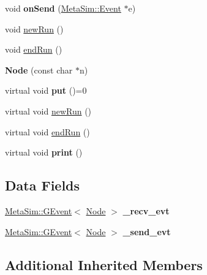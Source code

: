 \begin{DoxyCompactItemize}
\item 
void {\bfseries on\+Send} (\hyperlink{classMetaSim_1_1Event}{Meta\+Sim\+::\+Event} $\ast$e)\hypertarget{classNode_a5d78ceb9ef8fe8a3f0a89a7dd3409ce0}{}\label{classNode_a5d78ceb9ef8fe8a3f0a89a7dd3409ce0}

\item 
void \hyperlink{classNode_a7154231b573b4f86f200b890b580cc14}{new\+Run} ()
\item 
void \hyperlink{classNode_a9bee9183d5723f5565d97db1005c4ef6}{end\+Run} ()
\item 
{\bfseries Node} (const char $\ast$n)\hypertarget{classNode_a010914b8afc5679f8c27944caf4ac382}{}\label{classNode_a010914b8afc5679f8c27944caf4ac382}

\item 
virtual void {\bfseries put} ()=0\hypertarget{classNode_a574e741091ee2134958d06d815fa2178}{}\label{classNode_a574e741091ee2134958d06d815fa2178}

\item 
virtual void \hyperlink{classNode_a91735637f2d85d4dfd1bc6e39e12e624}{new\+Run} ()
\item 
virtual void \hyperlink{classNode_a9c61e469055fd886848d966ace657888}{end\+Run} ()
\item 
virtual void {\bfseries print} ()\hypertarget{classNode_ad0dbce835cd003bf45b0d4aa680cb411}{}\label{classNode_ad0dbce835cd003bf45b0d4aa680cb411}

\end{DoxyCompactItemize}
\subsection*{Data Fields}
\begin{DoxyCompactItemize}
\item 
\hyperlink{classMetaSim_1_1GEvent}{Meta\+Sim\+::\+G\+Event}$<$ \hyperlink{classNode}{Node} $>$ {\bfseries \+\_\+recv\+\_\+evt}\hypertarget{classNode_ae46080e3ecc889e2f1fca5a9df09fb1a}{}\label{classNode_ae46080e3ecc889e2f1fca5a9df09fb1a}

\item 
\hyperlink{classMetaSim_1_1GEvent}{Meta\+Sim\+::\+G\+Event}$<$ \hyperlink{classNode}{Node} $>$ {\bfseries \+\_\+send\+\_\+evt}\hypertarget{classNode_a1093886ba86e3794c1bad229a51ccde3}{}\label{classNode_a1093886ba86e3794c1bad229a51ccde3}

\end{DoxyCompactItemize}
\subsection*{Additional Inherited Members}


